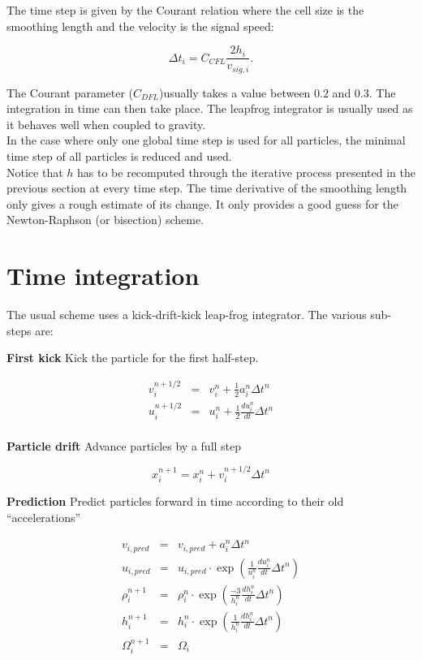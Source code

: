 \documentclass[a4paper,10pt]{report}
\begin{document}
The time step is given by the Courant relation where the cell size is the smoothing length and the velocity is the
signal speed:

\begin{equation}
 \Delta t_i = C_{CFL} \frac{2h_i}{v_{sig,i}}.
\label{eq:dt}
\end{equation}

The Courant parameter ($C_{DFL}$)usually takes a value between $0.2$ and $0.3$. The integration in time can then
take place. The
leapfrog integrator is usually used as it behaves well when coupled to gravity. \\
In the case where only one global time step is used for all particles, the minimal time step of all particles is reduced
and used. \\

Notice that $h$ has to be recomputed through the iterative process
presented in the previous section at every time step. The time
derivative of the smoothing length only gives a rough estimate of its
change. It only provides a good guess for the Newton-Raphson (or
bisection) scheme.

\section{Time integration}

The usual scheme uses a kick-drift-kick leap-frog integrator. The various sub-steps are:

\textbf{First kick} Kick the particle for the first half-step.

\begin{eqnarray*}
 v_i^{n+1/2} &=& v_i^{n} + \frac{1}{2} a_i^{n}\Delta t^n \\
 u_i^{n+1/2} &=& u_i^{n} + \frac{1}{2} \frac{du_i^n}{dt}\Delta t^n \\
\end{eqnarray*}

\textbf{Particle drift} Advance particles by a full step

\begin{equation*}
 x_i^{n+1} = x_i^n + v_i^{n+{1/2}} \Delta t^n
\end{equation*}

\textbf{Prediction} Predict particles forward in time according to their old ``accelerations''

\begin{eqnarray*}
 v_{i,pred} &=& v_{i,pred} + a_i^{n} \Delta t^n \\
  u_{i,pred} &=& u_{i,pred} \cdot \exp\left(\frac{1}{u_i^n}\frac{du_i^{n}}{dt} \Delta t^n\right)\\
 \rho_i^{n+1} &=& \rho_i^n \cdot \exp\left(\frac{-3}{h_i^n}  \frac{dh_i^{n}}{dt} \Delta t^n \right) \\
  h_i^{n+1} &=& h_i^n \cdot \exp\left(\frac{1}{h_i^n}  \frac{dh_i^{n}}{dt} \Delta t^n \right)   \\
  \Omega_i^{n+1} &=& \Omega_i
\end{eqnarray*}
\end{document}
